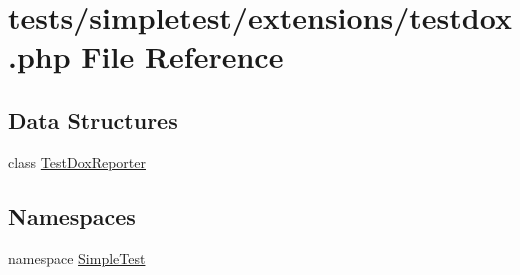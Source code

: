 \hypertarget{testdox_8php}{\section{tests/simpletest/extensions/testdox.php File Reference}
\label{testdox_8php}
}
\subsection*{Data Structures}
\begin{DoxyCompactItemize}
\item 
class \hyperlink{class_test_dox_reporter}{Test\-Dox\-Reporter}
\end{DoxyCompactItemize}
\subsection*{Namespaces}
\begin{DoxyCompactItemize}
\item 
namespace \hyperlink{namespace_simple_test}{Simple\-Test}
\end{DoxyCompactItemize}
